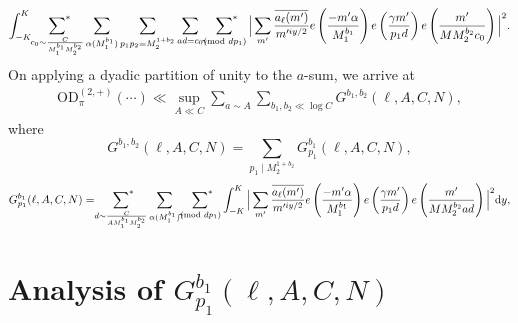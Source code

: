 \documentclass[12pt,a4paper,twoside, reqno]{amsart}
\newcommand{\shortmod}{\ensuremath{\negthickspace \negthickspace \negthickspace \pmod}}
\newcommand{\sumstar}{\sideset{}{^*}\sum}
\begin{document}
\begin{align*}
        \int_{-K}^K  \mathop{\sumstar_{ \substack{c_0 \sim \frac{C}{M_1^{b_1}M_2^{b_2}}
       } } }  \mathop{\sum}_{\substack{\alpha (M_1^{b_1})  }} \sum_{p_1p_2=M_2^{1+b_2}}  \sum_{ad=c_0}   
        \sumstar_{\substack{ \gamma \shortmod{dp_1} }  }\Big| \sum_{m^\prime}  \frac{ \overline{a_\ell(m^\prime)}}{m^{\prime iy/2}}  e\left(\frac{   - m^\prime \alpha}{M_1^{b_1}} \right)  e\left(\frac{ \gamma m^\prime}{p_1d} \right)  e\left(\frac{m^\prime}{MM_2^{b_2}c_0} \right)  \Big|^2.
\end{align*}  On applying a dyadic partition of unity to the $a$-sum, we arrive at 
\begin{align}\label{OD after a}
     \mathrm{OD}_{\pi}^{(2, +)}(\cdots)  \ll  \sup_{A \ll C}  \sum_{a \sim A} \sum_{b_1 , b_2 \ll  \log C } G_{}^{b_1,b_2}(\ell, A,C,N),
\end{align}
where 
\[ G_{}^{b_1,b_2}(\ell, A,C,N)= \sum_{p_1 \mid M_2^{1+b_2}}  G_{p_1}^{b_1}(\ell, A,C,N),\]
\begin{align}\label{Gp}
       G_{p_1}^{b_1}(\ell, A,C,N) =  \mathop{\sumstar_{ \substack{d \sim \frac{C}{AM_1^{b_1}M_2^{b_2}}
       } } }   \mathop{\sum}_{\substack{\alpha (M_1^{b_1})  }}  \sumstar_{\substack{ \gamma \shortmod{dp_1} }  } \int_{-K}^K \Big| \sum_{m^\prime}  \frac{ \overline{a_\ell(m^\prime)}}{m^{\prime iy/2}}  e\left(\frac{   - m^\prime \alpha}{M_1^{b_1}} \right)  e\left(\frac{ \gamma m^\prime}{p_1d} \right)  e\left(\frac{m^\prime}{MM_2^{b_2}ad} \right)  \Big|^2 \mathrm{d}y,
\end{align}
\section{Analysis of $ G_{p_1}^{b_1}(\ell, A,C,N)$   }
\end{document}
